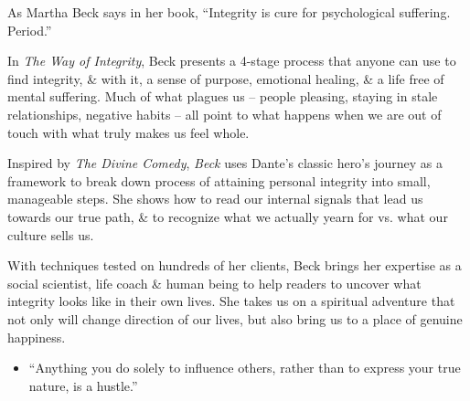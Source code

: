 \documentclass{article}
\begin{document}
\begin{enumerate}
	As {\sc Martha Beck} says in her book, ``Integrity is cure for psychological suffering. Period.''

	In {\it The Way of Integrity}, {\sc Beck} presents a 4-stage process that anyone can use to find integrity, \& with it, a sense of purpose, emotional healing, \& a life free of mental suffering. Much of what plagues us -- people pleasing, staying in stale relationships, negative habits -- all point to what happens when we are out of touch with what truly makes us feel whole.

	Inspired by {\it The Divine Comedy}, {\it Beck} uses {\sc Dante}'s classic hero's journey as a framework to break down process of attaining personal integrity into small, manageable steps. She shows how to read our internal signals that lead us towards our true path, \& to recognize what we actually yearn for vs. what our culture sells us.

	With techniques tested on hundreds of her clients, {\sc Beck} brings her expertise as a social scientist, life coach \& human being to help readers to uncover what integrity looks like in their own lives. She takes us on a spiritual adventure that not only will change direction of our lives, but also bring us to a place of genuine happiness.
	\begin{itemize}
		\item ``Anything you do solely to influence others, rather than to express your true nature, is a hustle.''


\end{itemize}
\end{enumerate}
\end{document}
